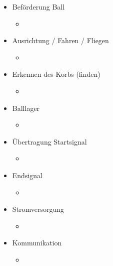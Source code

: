 \documentclass[a4paper,10pt,fleqn]{article}
\begin{document}
\begin{itemize}
    \item Beförderung Ball
    \begin{itemize}
        \item ~
    \end{itemize}
    \item Ausrichtung / Fahren / Fliegen
    \begin{itemize}
        \item ~
    \end{itemize}
    \item Erkennen des Korbs (finden)
    \begin{itemize}
        \item ~
    \end{itemize}
    \item Balllager
    \begin{itemize}
        \item ~
    \end{itemize}
    \item Übertragung Startsignal
    \begin{itemize}
        \item ~
    \end{itemize}
    \item Endsignal
    \begin{itemize}
        \item ~
    \end{itemize}
    \item Stromversorgung
    \begin{itemize}
        \item ~
    \end{itemize}
    \item Kommunikation
    \begin{itemize}
        \item ~
    \end{itemize}
\end{itemize}
\end{document}
